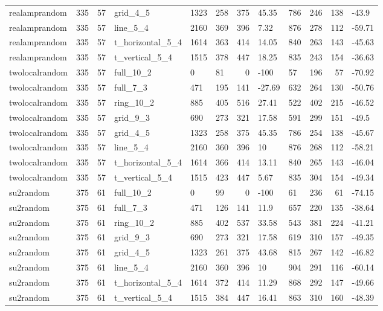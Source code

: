 \begin{longtable}{lrrlllrlllrl}
realamprandom & 335 & 57 & grid\_4\_5 & 1323 & 258 & 375 & 45.35 & 786 & 246 & 138 & -43.9 \\
realamprandom & 335 & 57 & line\_5\_4 & 2160 & 369 & 396 & 7.32 & 876 & 278 & 112 & -59.71 \\
realamprandom & 335 & 57 & t\_horizontal\_5\_4 & 1614 & 363 & 414 & 14.05 & 840 & 263 & 143 & -45.63 \\
realamprandom & 335 & 57 & t\_vertical\_5\_4 & 1515 & 378 & 447 & 18.25 & 835 & 243 & 154 & -36.63 \\
twolocalrandom & 335 & 57 & full\_10\_2 & 0 & 81 & 0 & -100 & 57 & 196 & 57 & -70.92 \\
twolocalrandom & 335 & 57 & full\_7\_3 & 471 & 195 & 141 & -27.69 & 632 & 264 & 130 & -50.76 \\
twolocalrandom & 335 & 57 & ring\_10\_2 & 885 & 405 & 516 & 27.41 & 522 & 402 & 215 & -46.52 \\
twolocalrandom & 335 & 57 & grid\_9\_3 & 690 & 273 & 321 & 17.58 & 591 & 299 & 151 & -49.5 \\
twolocalrandom & 335 & 57 & grid\_4\_5 & 1323 & 258 & 375 & 45.35 & 786 & 254 & 138 & -45.67 \\
twolocalrandom & 335 & 57 & line\_5\_4 & 2160 & 360 & 396 & 10 & 876 & 268 & 112 & -58.21 \\
twolocalrandom & 335 & 57 & t\_horizontal\_5\_4 & 1614 & 366 & 414 & 13.11 & 840 & 265 & 143 & -46.04 \\
twolocalrandom & 335 & 57 & t\_vertical\_5\_4 & 1515 & 423 & 447 & 5.67 & 835 & 304 & 154 & -49.34 \\
su2random & 375 & 61 & full\_10\_2 & 0 & 99 & 0 & -100 & 61 & 236 & 61 & -74.15 \\
su2random & 375 & 61 & full\_7\_3 & 471 & 126 & 141 & 11.9 & 657 & 220 & 135 & -38.64 \\
su2random & 375 & 61 & ring\_10\_2 & 885 & 402 & 537 & 33.58 & 543 & 381 & 224 & -41.21 \\
su2random & 375 & 61 & grid\_9\_3 & 690 & 273 & 321 & 17.58 & 619 & 310 & 157 & -49.35 \\
su2random & 375 & 61 & grid\_4\_5 & 1323 & 261 & 375 & 43.68 & 815 & 267 & 142 & -46.82 \\
su2random & 375 & 61 & line\_5\_4 & 2160 & 360 & 396 & 10 & 904 & 291 & 116 & -60.14 \\
su2random & 375 & 61 & t\_horizontal\_5\_4 & 1614 & 372 & 414 & 11.29 & 868 & 292 & 147 & -49.66 \\
su2random & 375 & 61 & t\_vertical\_5\_4 & 1515 & 384 & 447 & 16.41 & 863 & 310 & 160 & -48.39 \\

\end{longtable}
